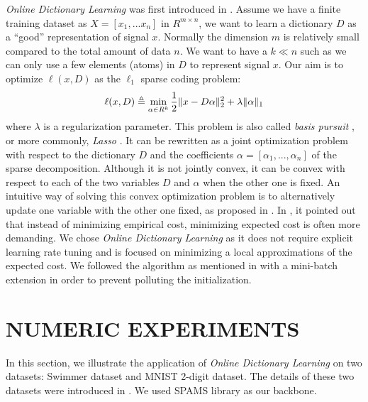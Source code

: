\documentclass[conference]{IEEEtran}
\begin{document}
\textit{Online Dictionary Learning} was first introduced in \cite{b4}. Assume we have a finite training dataset as $ X=[x_1,...x_n] $ in $R^{m\times n}$, we want to learn a dictionary $D$ as a ``good'' representation of signal $x$. Normally the dimension $m$ is relatively small compared to the total amount of data $n$. We want to have a $k\ll n$ such as we can only use a few elements (atoms) in $D$ to represent signal $x$. Our aim is to optimize $\ell(x, D)$ as the $\ell_{1}$ sparse coding problem:
$$ \ell(x, D) \triangleq \min\limits_{\alpha \in R^k} \frac{1}{2}\Arrowvert x-D\alpha \Arrowvert^{2}_{2}+\lambda\Arrowvert \alpha \Arrowvert_{1}$$
where $ \lambda $ is a regularization parameter. This problem is also called \textit{basis pursuit} \cite{b6}, or more commonly, \textit{Lasso}  \cite{b7}. It can be rewritten as a joint optimization problem with respect to the dictionary $D$ and the coefficients $\alpha=[\alpha_1,...,\alpha_n]$ of the
sparse decomposition. Although it is not jointly convex, it can be convex with respect to each of the two variables $D$ and $\alpha$ when
the other one is fixed. An intuitive way of solving this convex optimization problem is to alternatively update one variable with the other one fixed, as proposed in \cite{b8}. In \cite{b9}, it pointed out that instead of minimizing empirical cost, minimizing expected cost is often more demanding. We chose \textit{Online Dictionary Learning} as it does not require explicit learning
rate tuning and is focused on minimizing a local approximations of the expected cost. We followed the algorithm as mentioned in \cite{b4} with a mini-batch extension in order to prevent polluting the initialization.

\section{NUMERIC EXPERIMENTS}
In this section, we illustrate the application of \textit{Online Dictionary Learning} on two datasets: Swimmer dataset and MNIST 2-digit dataset. The details of these two datasets were introduced in \cite{b5}. We used SPAMS library \cite{b10,b11} as our backbone.

\end{document}
